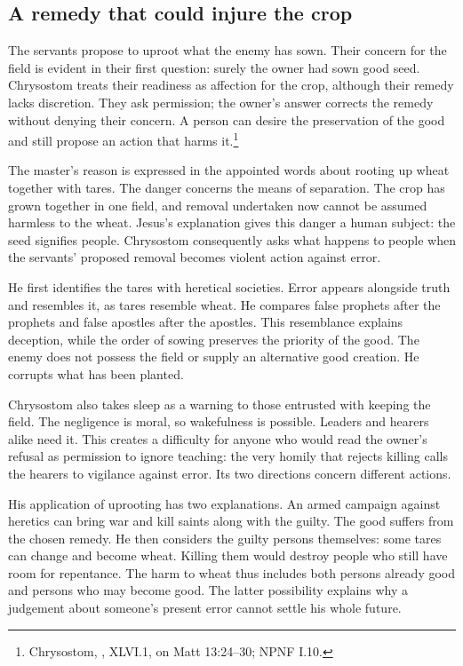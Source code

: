 \subsection{A remedy that could injure the crop}
The servants propose to uproot what the enemy has sown. Their concern
for the field is evident in their first question: surely the owner had
sown good seed. Chrysostom treats their readiness as affection for the
crop, although their remedy lacks discretion. They ask permission; the
owner's answer corrects the remedy without denying their concern.
A person can desire the preservation of the good and still propose an
action that harms it.\footnote{Chrysostom, ,
XLVI.1, on Matt 13:24--30; NPNF I.10.}

The master's reason is expressed in the appointed words about rooting
up wheat together with tares. The danger concerns the means of separation.
The crop has grown together in one field, and removal undertaken now
cannot be assumed harmless to the wheat. Jesus's explanation gives this
danger a human subject: the seed signifies people. Chrysostom consequently
asks what happens to people when the servants' proposed removal becomes
violent action against error.

He first identifies the tares with heretical societies. Error appears
alongside truth and resembles it, as tares resemble wheat. He compares
false prophets after the prophets and false apostles after the apostles.
This resemblance explains deception, while the order of sowing preserves
the priority of the good. The enemy does not possess the field or supply
an alternative good creation. He corrupts what has been planted.

Chrysostom also takes sleep as a warning to those entrusted with keeping
the field. The negligence is moral, so wakefulness is possible. Leaders
and hearers alike need it. This creates a difficulty for anyone who would
read the owner's refusal as permission to ignore teaching: the very
homily that rejects killing calls the hearers to vigilance against error.
Its two directions concern different actions.

His application of uprooting has two explanations. An armed campaign
against heretics can bring war and kill saints along with the guilty.
The good suffers from the chosen remedy. He then considers the guilty
persons themselves: some tares can change and become wheat. Killing
them would destroy people who still have room for repentance. The harm
to wheat thus includes both persons already good and persons who may
become good. The latter possibility explains why a judgement about
someone's present error cannot settle his whole future.

